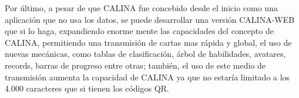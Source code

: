 Por último, a pesar de que CALINA fue concebido desde el inicio como una aplicación que no usa los datos, se 
puede desarrollar una versión CALINA-WEB que si lo haga, expandiendo enorme mente las capacidades del concepto 
de CALINA, permitiendo una transmisión de cartas mas rápida y global, el uso de nuevas mecánicas, como tablas 
de clasificación, árbol de habilidades, avatares, records, barras de progreso entre otras; también, el uso 
de este medio de transmisión aumenta la capacidad de CALINA ya que no estaría limitado a los 4.000 caracteres 
que si tienen los códigos QR.

